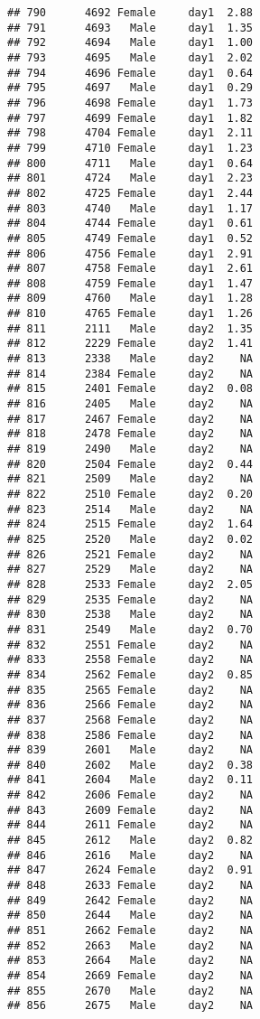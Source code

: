 \documentclass[
]{article}
\begin{document}
\begin{verbatim}
## 790      4692 Female     day1  2.88
## 791      4693   Male     day1  1.35
## 792      4694   Male     day1  1.00
## 793      4695   Male     day1  2.02
## 794      4696 Female     day1  0.64
## 795      4697   Male     day1  0.29
## 796      4698 Female     day1  1.73
## 797      4699 Female     day1  1.82
## 798      4704 Female     day1  2.11
## 799      4710 Female     day1  1.23
## 800      4711   Male     day1  0.64
## 801      4724   Male     day1  2.23
## 802      4725 Female     day1  2.44
## 803      4740   Male     day1  1.17
## 804      4744 Female     day1  0.61
## 805      4749 Female     day1  0.52
## 806      4756 Female     day1  2.91
## 807      4758 Female     day1  2.61
## 808      4759 Female     day1  1.47
## 809      4760   Male     day1  1.28
## 810      4765 Female     day1  1.26
## 811      2111   Male     day2  1.35
## 812      2229 Female     day2  1.41
## 813      2338   Male     day2    NA
## 814      2384 Female     day2    NA
## 815      2401 Female     day2  0.08
## 816      2405   Male     day2    NA
## 817      2467 Female     day2    NA
## 818      2478 Female     day2    NA
## 819      2490   Male     day2    NA
## 820      2504 Female     day2  0.44
## 821      2509   Male     day2    NA
## 822      2510 Female     day2  0.20
## 823      2514   Male     day2    NA
## 824      2515 Female     day2  1.64
## 825      2520   Male     day2  0.02
## 826      2521 Female     day2    NA
## 827      2529   Male     day2    NA
## 828      2533 Female     day2  2.05
## 829      2535 Female     day2    NA
## 830      2538   Male     day2    NA
## 831      2549   Male     day2  0.70
## 832      2551 Female     day2    NA
## 833      2558 Female     day2    NA
## 834      2562 Female     day2  0.85
## 835      2565 Female     day2    NA
## 836      2566 Female     day2    NA
## 837      2568 Female     day2    NA
## 838      2586 Female     day2    NA
## 839      2601   Male     day2    NA
## 840      2602   Male     day2  0.38
## 841      2604   Male     day2  0.11
## 842      2606 Female     day2    NA
## 843      2609 Female     day2    NA
## 844      2611 Female     day2    NA
## 845      2612   Male     day2  0.82
## 846      2616   Male     day2    NA
## 847      2624 Female     day2  0.91
## 848      2633 Female     day2    NA
## 849      2642 Female     day2    NA
## 850      2644   Male     day2    NA
## 851      2662 Female     day2    NA
## 852      2663   Male     day2    NA
## 853      2664   Male     day2    NA
## 854      2669 Female     day2    NA
## 855      2670   Male     day2    NA
## 856      2675   Male     day2    NA

\end{verbatim}
\end{document}
